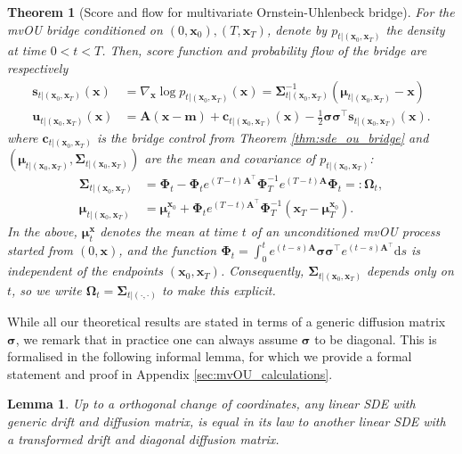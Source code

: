 \documentclass{article}
\newcommand{\diff}{\mathrm{d}}
\theoremstyle{newstyle}
\newtheorem{lem}{Lemma}
\newtheorem{thm}{Theorem}
\begin{document}
\begin{thm}[Score and flow for multivariate Ornstein-Uhlenbeck bridge]\label{thm:score_flow_ou_bridge}
  For the mvOU bridge conditioned on $(0, \bm{x}_0), (T, \bm{x}_T)$, denote by $p_{t | (\bm{x}_0, \bm{x}_T)}$ the density at time $0 < t < T$. Then, score function and probability flow of the bridge are respectively
  \begin{align}
    \bm{s}_{t | (\bm{x}_0, \bm{x}_T)}(\bm{x}) &= \nabla_{\bm{x}} \log p_{t | (\bm{x}_0, \bm{x}_T)}(\bm{x}) = \bm{\Sigma}_{t | (\bm{x}_0, \bm{x}_T)}^{-1} (\bm{\mu}_{t|(\bm{x}_0, \bm{x}_T)} - \bm{x}) \label{eq:ou_bridge_score}\\ 
    \bm{u}_{t | (\bm{x}_0, \bm{x}_T)}(\bm{x}) &= \bm{A}(\bm{x} - \bm{m}) + \bm{c}_{t|(\bm{x}_0, \bm{x}_T)}(\bm{x}) - \textstyle\frac{1}{2} \bm{\sigma}\bm{\sigma}^\top \bm{s}_{t | (\bm{x}_0, \bm{x}_T)}(\bm{x}). \label{eq:ou_bridge_flow}
  \end{align}
  where $\bm{c}_{t | (\bm{x}_0, \bm{x}_T)}$ is the bridge control from Theorem \ref{thm:sde_ou_bridge} and $(\bm{\mu}_{t|(\bm{x}_0, \bm{x}_T)}, \bm{\Sigma}_{t|(\bm{x}_0, \bm{x}_T)})$ are the mean and covariance of $p_{t | (\bm{x}_0, \bm{x}_T)}$:
  \begin{align}
    \bm{\Sigma}_{t|(\bm{x}_0, \bm{x}_T)} &= \bm{\Phi}_t - \bm{\Phi}_t e^{(T-t) \bm{A}^\top} \bm{\Phi}_T^{-1} e^{(T-t) \bm{A}} \bm{\Phi}_t =: \bm{\Omega}_t, \label{eq:ou_bridge_cov}\\ 
    \bm{\mu}_{t|(\bm{x}_0, \bm{x}_T)} &= \bm{\mu}_t^{\bm{x}_0} + \bm{\Phi}_t e^{(T-t) \bm{A}^\top} \bm{\Phi}_T^{-1} (\bm{x}_T - \bm{\mu}_T^{\bm{x}_0}). \label{eq:ou_bridge_mean}
  \end{align}
  In the above, $\bm{\mu}_t^{\bm{x}}$ denotes the mean at time $t$ of an \emph{unconditioned} mvOU process started from $(0, \bm{x})$, and the function  $\bm{\Phi}_t = \int_0^t e^{(t-s)\bm{A}} \bm{\sigma}\bm{\sigma}^\top e^{(t-s)\bm{A}^\top} \diff s$ is independent of the endpoints $(\bm{x}_0, \bm{x}_T)$. Consequently, $\bm{\Sigma}_{t | (\bm{x}_0, \bm{x}_T)}$ depends only on $t$, so we write $\bm{\Omega}_t = \bm{\Sigma}_{t | (\cdot, \cdot)}$ to make this explicit. 
\end{thm}

While all our theoretical results are stated in terms of a generic diffusion matrix $\bm{\sigma}$, we remark that in practice one can always assume $\bm{\sigma}$ to be diagonal. This is formalised in the following informal lemma, for which we provide a formal statement and proof in Appendix \ref{sec:mvOU_calculations}. 
\begin{lem}
  Up to a orthogonal change of coordinates, any linear SDE with generic drift and diffusion matrix, is equal in its law to another linear SDE with a transformed drift and diagonal diffusion matrix.
  \label{lem:diagonal_diffusion}
\end{lem}
\end{document}
